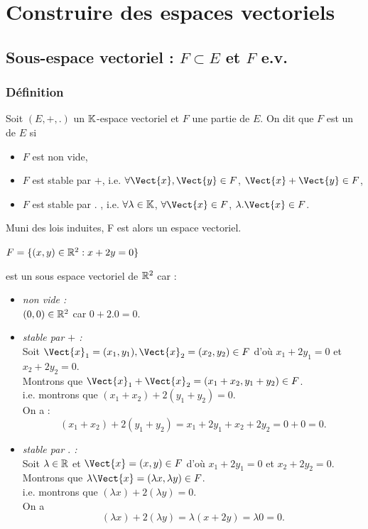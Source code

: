 \documentclass{book}
\begin{document}
\section{Construire des espaces vectoriels}
\subsection{Sous-espace vectoriel : $F\subset E$ et $F$ e.v.}
\subsubsection{Définition}
\begin{DefinitionProposition}
Soit $(E,+,.)$ un $\mathbb{K} $-espace vectoriel et $F$ une partie de $E$.
On dit que $F$ est un  de $E$ si
\begin{itemize}
\item
  $F$ est non vide,
\item
  $F$ est stable par $+$, i.e.   $\forall \Vect{x},\Vect{y} \in F$, $\Vect{x}+\Vect{y}\in F$,
\item
  $F$ est stable par $.$ , i.e.   $\forall \lambda \in \mathbb{K} $, $\forall \Vect{x} \in F$, $\lambda .\Vect{x}\in F$.
\end{itemize}
Muni des lois induites, F est alors un espace vectoriel.
\end{DefinitionProposition}
\begin{Exemple}
$F=\{(x,y)\in\mathbb{R}^2:x+2y=0\}$  est un sous espace vectoriel de $\mathbb{R}^2$ 
car :
\begin{itemize}
\item \textit{non vide :}\\
$(0,0)\in \mathbb{R}^2$ car $0+2.0=0.$
\item \textit{stable par $+$ :}\\
Soit $\Vect{x}_1=(x_1,y_1),\Vect{x}_2=(x_2,y_2) \in F $ d'où $ x_1+2y_1=0$ et $ x_2+2y_2=0$.\\
Montrons que $\Vect{x}_1+\Vect{x}_2=(x_1+x_2,y_1+y_2)\in F$.\\
i.e. montrons que $(x_1+x_2)+2(y_1+y_2)=0$.\\
On a :
$$(x_1+x_2)+2(y_1+y_2)= x_1+2y_1 + x_2+2y_2 = 0+0 =0.$$
\item
  \textit{stable par $.$ :} \\
Soit $\lambda\in \mathbb{R}$ et $\Vect{x}=(x,y)\in F $ d'où $ x_1+2y_1=0$ et $ x_2+2y_2=0$.\\
Montrons que $\lambda\Vect{x}=( \lambda x,\lambda  y)\in F$.\\
i.e. montrons que $(\lambda x)+2(\lambda  y)=0$.\\
On a 
$$(\lambda x)+2(\lambda  y)= \lambda (x +2 y) = \lambda 0 =0.$$  
\end{itemize}
\end{Exemple}
\end{document}
